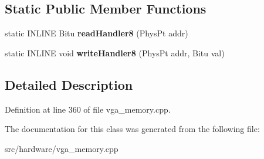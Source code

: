 \subsection*{Static Public Member Functions}
\begin{DoxyCompactItemize}
\item 
\hypertarget{classVGA__ChainedVGA__Slow__Handler_a2c5d68cdb3b70c99d265eea42d938fce}{static I\-N\-L\-I\-N\-E Bitu {\bfseries read\-Handler8} (Phys\-Pt addr)}\label{classVGA__ChainedVGA__Slow__Handler_a2c5d68cdb3b70c99d265eea42d938fce}

\item 
\hypertarget{classVGA__ChainedVGA__Slow__Handler_a26b66b53a5e61455ae92a9c394a6d6b7}{static I\-N\-L\-I\-N\-E void {\bfseries write\-Handler8} (Phys\-Pt addr, Bitu val)}\label{classVGA__ChainedVGA__Slow__Handler_a26b66b53a5e61455ae92a9c394a6d6b7}

\end{DoxyCompactItemize}


\subsection{Detailed Description}


Definition at line 360 of file vga\-\_\-memory.\-cpp.



The documentation for this class was generated from the following file\-:\begin{DoxyCompactItemize}
\item 
src/hardware/vga\-\_\-memory.\-cpp\end{DoxyCompactItemize}
